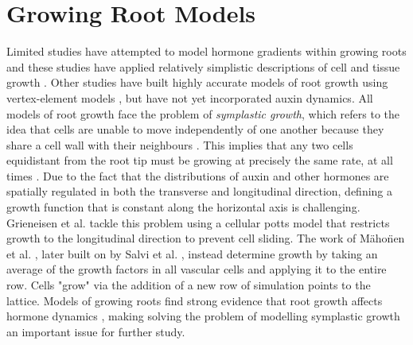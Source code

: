 \section{Growing Root Models}

Limited studies have attempted to model hormone gradients within growing roots \cite{grieneisen2007, muraro2013, mahonen2014, salvi2020} and these studies have applied relatively simplistic descriptions of cell and tissue growth \cite{rutten2022}. Other studies have built highly accurate models of root growth using vertex-element models \cite{fozard2013, fozard2016}, but have not yet incorporated auxin dynamics. All models of root growth face the problem of \emph{symplastic growth}, which refers to the idea that cells are unable to move independently of one another because they share a cell wall with their neighbours \cite{ivanov2002}. This implies that any two cells equidistant from the root tip must be growing at precisely the same rate, at all times \cite{ivanov2002}. Due to the fact that the distributions of auxin and other hormones are spatially regulated in both the transverse and longitudinal direction, defining a growth function that is constant along the horizontal axis is challenging. Grieneisen et al. \cite{grieneisen2007} tackle this problem using a cellular potts model that restricts growth to the longitudinal direction to prevent cell sliding.  The work of M\"{a}ho\"{n}en et al. \cite{mahonen2014}, later built on by Salvi et al. \cite{salvi2020}, instead determine growth by taking an average of the growth factors in all vascular cells and applying it to the entire row. Cells "grow" via the addition of a new row of simulation points to the lattice. Models of growing roots find strong evidence that root growth affects hormone dynamics \cite{rutten2022}, making solving the problem of modelling symplastic growth an important issue for further study.



